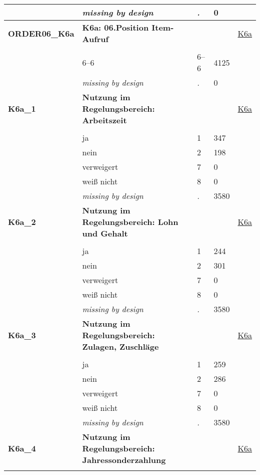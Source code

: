 \begin{longtable}{| L{2.65cm} | L{8cm} | C{1.5cm} | R{1.25cm} | C{2.25cm}  |}
   & \textit{missing by design} & \textit{.} & 0 &  \\ 
   \midrule
\textbf{ORDER06\_K6a}\label{var:ORDER06:K6a} & \textbf{K6a: 06.Position Item-Aufruf} &  &  & \hyperref[K6a]{K6a} \\ 
   &  &  &  &  \\ 
   & 6--6 & 6--6 & 4125 &  \\ 
   & \textit{missing by design} & \textit{.} & 0 &  \\ 
   \midrule
\textbf{K6a\_1}\label{var:K6a:1} & \textbf{Nutzung im Regelungsbereich: Arbeitszeit} &  &  & \hyperref[K6a]{K6a} \\ 
   &  &  &  &  \\ 
   & ja & 1 & 347 &  \\ 
   & nein & 2 & 198 &  \\ 
   & verweigert & 7 & 0 &  \\ 
   & weiß nicht & 8 & 0 &  \\ 
   & \textit{missing by design} & \textit{.} & 3580 &  \\ 
   \midrule
\textbf{K6a\_2}\label{var:K6a:2} & \textbf{Nutzung im Regelungsbereich: Lohn und Gehalt} &  &  & \hyperref[K6a]{K6a} \\ 
   &  &  &  &  \\ 
   & ja & 1 & 244 &  \\ 
   & nein & 2 & 301 &  \\ 
   & verweigert & 7 & 0 &  \\ 
   & weiß nicht & 8 & 0 &  \\ 
   & \textit{missing by design} & \textit{.} & 3580 &  \\ 
   \midrule
\textbf{K6a\_3}\label{var:K6a:3} & \textbf{Nutzung im Regelungsbereich: Zulagen, Zuschläge} &  &  & \hyperref[K6a]{K6a} \\ 
   &  &  &  &  \\ 
   & ja & 1 & 259 &  \\ 
   & nein & 2 & 286 &  \\ 
   & verweigert & 7 & 0 &  \\ 
   & weiß nicht & 8 & 0 &  \\ 
   & \textit{missing by design} & \textit{.} & 3580 &  \\ 
   \midrule
\textbf{K6a\_4}\label{var:K6a:4} & \textbf{Nutzung im Regelungsbereich: Jahressonderzahlung} &  &  & \hyperref[K6a]{K6a} \\ 
   &  &  &  &  \\ 

\end{longtable}
